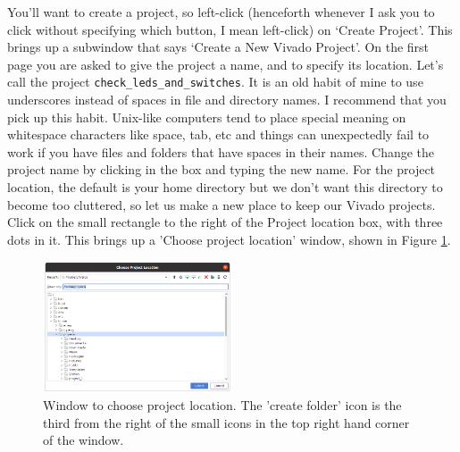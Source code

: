 \documentclass[../physical_computing.tex]{subfiles}
\begin{document}
You'll want to create a project, so left-click (henceforth whenever I ask you to click without specifying which button, I mean left-click) on `Create Project'. This brings up a subwindow that says `Create a New Vivado Project'. On the first page you are asked to give the project a name, and to specify its location. Let's call the project \texttt{check\_leds\_and\_switches}. It is an old habit of mine to use underscores instead of spaces in file and directory names. I recommend that you pick up this habit. Unix-like computers tend to place special meaning on whitespace characters like space, tab, etc and things can unexpectedly fail to work if you have files and folders that have spaces in their names. Change the project name by clicking in the box and typing the new name. For the project location, the default is your home directory but we don't want this directory to become too cluttered, so let us make a new place to keep our Vivado projects. Click on the small rectangle to the right of the Project location box, with three dots in it. This brings up a 'Choose project location' window, shown in Figure \ref{fig:choose_project_location}. 

\begin{figure}[htbp]
    \centering
    \includegraphics[width=0.5\textwidth]{figures/choose_project_location.png}
    \caption{Window to choose project location. The 'create folder' icon is the third from the right of the small icons in the top right hand corner of the window.}
    \label{fig:choose_project_location}
\end{figure}
\end{document}
